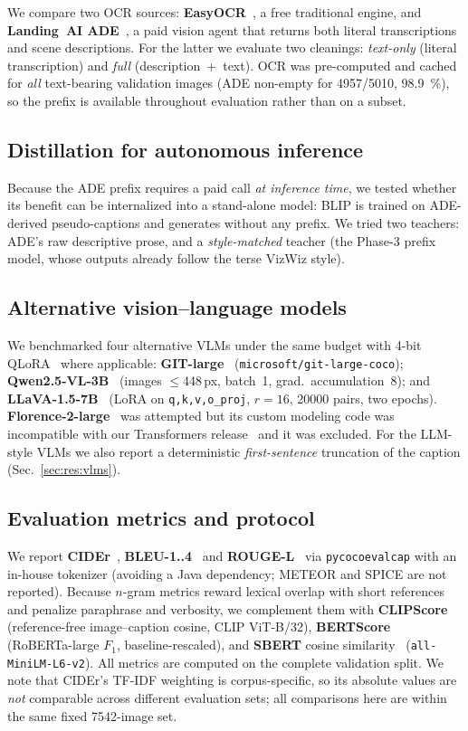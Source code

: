 We compare two OCR sources: \textbf{EasyOCR}~\cite{easyocr}, a free traditional
engine, and \textbf{Landing~AI ADE}~\cite{landingai}, a paid vision agent that
returns both literal transcriptions and scene descriptions. For the latter we
evaluate two cleanings: \emph{text-only} (literal transcription) and \emph{full}
(description~$+$~text). OCR was pre-computed and cached for \emph{all} text-bearing
validation images (ADE non-empty for \num{4957}/\num{5010}, \SI{98.9}{\percent}),
so the prefix is available throughout evaluation rather than on a subset.

\subsection{Distillation for autonomous inference}
\label{sec:distill}
Because the ADE prefix requires a paid call \emph{at inference time}, we tested
whether its benefit can be internalized into a stand-alone model: BLIP is trained
on ADE-derived pseudo-captions and generates without any prefix. We tried two
teachers: ADE's raw descriptive prose, and a \emph{style-matched} teacher (the
Phase-3 prefix model, whose outputs already follow the terse VizWiz style).

\subsection{Alternative vision--language models}
\label{sec:vlms}
We benchmarked four alternative VLMs under the same budget with 4-bit
QLoRA~\cite{qlora} where applicable: \textbf{GIT-large}~\cite{git}
(\texttt{microsoft/git-large-coco}); \textbf{Qwen2.5-VL-3B}~\cite{qwen25vl}
(images $\le$\num{448}\,px, batch~1, grad.\ accumulation~8); and
\textbf{LLaVA-1.5-7B}~\cite{llava} (LoRA on \texttt{q,k,v,o\_proj}, $r{=}16$,
\num{20000} pairs, two epochs). \textbf{Florence-2-large}~\cite{florence2} was
attempted but its custom modeling code was incompatible with our Transformers
release~\cite{transformers} and it was excluded. For the LLM-style VLMs we also
report a deterministic \emph{first-sentence} truncation of the caption
(Sec.~\ref{sec:res:vlms}).

\subsection{Evaluation metrics and protocol}
\label{sec:metrics}
We report \textbf{CIDEr}~\cite{cider}, \textbf{BLEU-1..4}~\cite{bleu} and
\textbf{ROUGE-L}~\cite{rouge} via \texttt{pycocoevalcap} with an in-house
tokenizer (avoiding a Java dependency; METEOR and SPICE are not reported). Because
$n$-gram metrics reward lexical overlap with short references and penalize
paraphrase and verbosity, we complement them with \textbf{CLIPScore}~\cite{clipscore}
(reference-free image--caption cosine, CLIP ViT-B/32), \textbf{BERTScore}~\cite{bertscore}
(RoBERTa-large $F_1$, baseline-rescaled), and \textbf{SBERT} cosine
similarity~\cite{sbert} (\texttt{all-MiniLM-L6-v2}). All metrics are computed on
the complete validation split. We note that CIDEr's TF-IDF weighting is
corpus-specific, so its absolute values are \emph{not} comparable across different
evaluation sets; all comparisons here are within the same fixed \num{7542}-image set.

